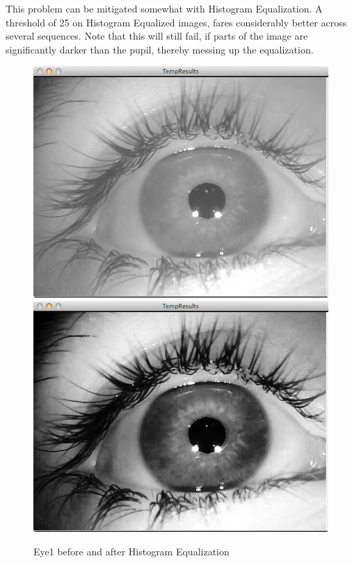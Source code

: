 \documentclass[a4paper,11pt]{article}
\begin{document}
This problem can be mitigated somewhat with Histogram Equalization. A threshold of 25 on Histogram Equalized images, fares considerably better across several sequences. Note that this will still fail, if parts of the image are significantly darker than the pupil, thereby messing up the equalization.

\begin{figure}[ht]
  \centering
  \includegraphics[scale=0.2]{eye1}
  \includegraphics[scale=0.2]{eye1_hist_eq}
  \caption{Eye1 before and after Histogram Equalization}
  \label{fig:eye1_hist_eq}
\end{figure}
\end{document}
